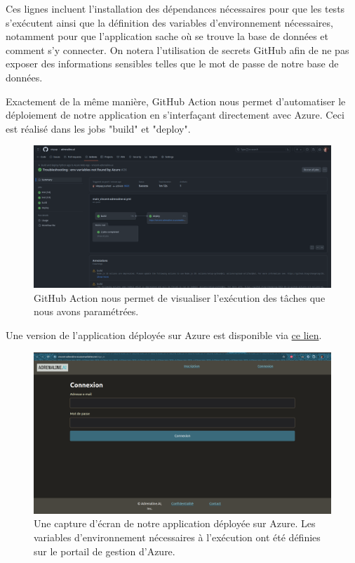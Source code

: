 \documentclass[french]{article}
\begin{document}
    Ces lignes incluent l'installation des dépendances nécessaires pour que les tests s'exécutent ainsi que la définition des variables d'environnement nécessaires, notamment pour que l'application sache où se trouve la base de données et comment s'y connecter. On notera l'utilisation de secrets GitHub afin de ne pas exposer des informations sensibles telles que le mot de passe de notre base de données.

    Exactement de la même manière, GitHub Action nous permet d'automatiser le déploiement de notre application en s'interfaçant directement avec Azure. Ceci est réalisé dans les jobs "build" et "deploy".
    \begin{figure}[h!]
        \includegraphics[width=12cm]{gh_action_1}
        \centering
        \caption{GitHub Action nous permet de visualiser l'exécution des tâches que nous avons paramétrées.}
        \centering
    \end{figure}
    
    Une version de l'application déployée sur Azure est disponible via \href{https://vincent-adrenaline-ai.azurewebsites.net/}{ce lien}. 

    \begin{figure}[h!]
        \includegraphics[width=12cm]{azure}
        \centering
        \caption{Une capture d'écran de notre application déployée sur Azure. Les variables d'environnement nécessaires à l'exécution ont été définies sur le portail de gestion d'Azure.}
        \centering
    \end{figure}
    
\end{document}
